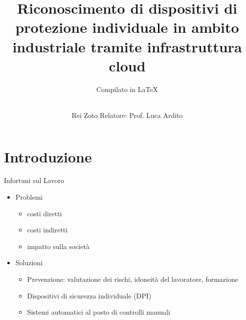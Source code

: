 \documentclass{beamer}
\title{Riconoscimento di dispositivi di
protezione individuale in ambito
industriale tramite infrastruttura
cloud}
\subtitle{\tiny Compilato in \LaTeX}
\author{ \href{mailto:rei.zoto@studenti.polito.it}{}\\{\small Rei Zoto \hspace{1cm} Relatore: Prof. Luca Ardito}
}
\begin{document}
\maketitle

\section{Introduzione}

\begin{frame}{Infortuni sul Lavoro}
\begin{itemize}
    \item Problemi
    	\begin{itemize}
    		\item costi diretti
    		\item costi indiretti
    		\item impatto sulla società
    	\end{itemize}	
    \item Soluzioni
    \begin{itemize}
    	\item Prevenzione: valutazione dei rischi, idoneità del lavoratore, formazione
    	\item Dispositivi di sicurezza individuale (DPI)
    	\item Sistemi automatici al posto di controlli manuali
    \end{itemize}
\end{itemize}
\end{frame}
\end{document}
